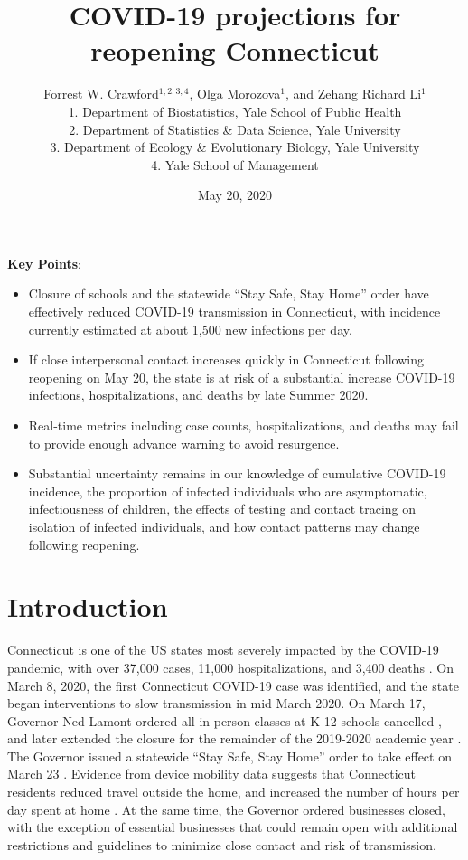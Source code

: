 \documentclass[11pt]{article}
\title{COVID-19 projections for reopening Connecticut}
\author{
  Forrest W. Crawford$^{1,2,3,4}$,
  Olga Morozova$^{1}$, 
  and
  Zehang Richard Li$^1$
  \\[1em]
\small 1. Department of Biostatistics, Yale School of Public Health \\
\small 2. Department of Statistics \& Data Science, Yale University \\
\small 3. Department of Ecology \& Evolutionary Biology, Yale University \\
\small 4. Yale School of Management }
\date{May 20, 2020}
\begin{document}
\maketitle


\textbf{Key Points}:
\vspace{-0.5em}
\begin{itemize}%
	\setlength\itemsep{0em}
	\setlength\parsep{0em}
	\setlength\topsep{0em}
  \item Closure of schools and the statewide ``Stay Safe, Stay Home'' order have effectively reduced COVID-19 transmission in Connecticut, with incidence currently estimated at about 1,500 new infections per day.
  \item If close interpersonal contact increases quickly in Connecticut following reopening on May 20, the state is at risk of a substantial increase COVID-19 infections, hospitalizations, and deaths by late Summer 2020.
  \item Real-time metrics including case counts, hospitalizations, and deaths may fail to provide enough advance warning to avoid resurgence.  
  \item Substantial uncertainty remains in our knowledge of cumulative COVID-19 incidence, the proportion of infected individuals who are asymptomatic, infectiousness of children, the effects of testing and contact tracing on isolation of infected individuals, and how contact patterns may change following reopening.  
\end{itemize}



\section*{Introduction}

Connecticut is one of the US states most severely impacted by the COVID-19 pandemic, with over 37,000 cases, 11,000 hospitalizations, and 3,400 deaths \citep{nyt2020Connecticut,atlantic2020data}.  On March 8, 2020, the first Connecticut COVID-19 case was identified, and the state began interventions to slow transmission in mid March 2020.  On March 17, Governor Ned Lamont ordered all in-person classes at K-12 schools cancelled \citep{lamont2020exec7c}, and later extended the closure for the remainder of the 2019-2020 academic year \citep{lamont2020exec7l,lamont2020exec7x,lamont2020exec7ii}.  The Governor issued a statewide ``Stay Safe, Stay Home'' order to take effect on March 23 \citep{lamont2020exec7h}.  Evidence from device mobility data suggests that Connecticut residents reduced travel outside the home, and increased the number of hours per day spent at home \citep{google2020covid,facebook2020covid}. At the same time, the Governor ordered businesses closed, with the exception of essential businesses that could remain open with additional restrictions and guidelines to minimize close contact and risk of transmission. 
\end{document}
